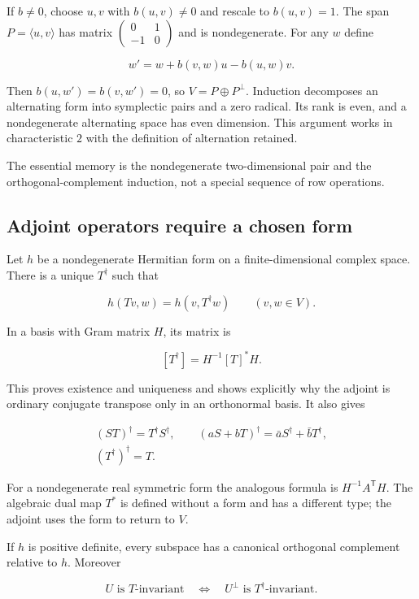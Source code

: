 \documentclass[
  11pt,
]{article}
\begin{document}
If \(b\ne0\), choose \(u,v\) with \(b(u,v)\ne0\) and rescale to
\(b(u,v)=1\). The span \(P=\langle u,v\rangle\) has matrix
\(\begin{pmatrix}0&1\\-1&0\end{pmatrix}\) and is nondegenerate. For any
\(w\) define

\[w'=w+b(v,w)u-b(u,w)v.\]

Then \(b(u,w')=b(v,w')=0\), so \(V=P\oplus P^\perp\). Induction
decomposes an alternating form into symplectic pairs and a zero radical.
Its rank is even, and a nondegenerate alternating space has even
dimension. This argument works in characteristic \(2\) with the
definition of alternation retained.

The essential memory is the nondegenerate two-dimensional pair and the
orthogonal-complement induction, not a special sequence of row
operations.

\subsection{Adjoint operators require a chosen
form}\label{adjoint-operators-require-a-chosen-form}

Let \(h\) be a nondegenerate Hermitian form on a finite-dimensional
complex space. There is a unique \(T^\dagger\) such that

\[h(Tv,w)=h(v,T^\dagger w)\qquad(v,w\in V).\]

In a basis with Gram matrix \(H\), its matrix is

\[[T^\dagger]=H^{-1}[T]^*H.\]

This proves existence and uniqueness and shows explicitly why the
adjoint is ordinary conjugate transpose only in an orthonormal basis. It
also gives

\[\begin{gathered}
(ST)^\dagger=T^\dagger S^\dagger,\qquad
(aS+bT)^\dagger=\bar aS^\dagger+\bar bT^\dagger,\\
(T^\dagger)^\dagger=T.
\end{gathered}\]

For a nondegenerate real symmetric form the analogous formula is
\(H^{-1}A^{\mathsf T}H\). The algebraic dual map \(T^*\) is defined
without a form and has a different type; the adjoint uses the form to
return to \(V\).

If \(h\) is positive definite, every subspace has a canonical orthogonal
complement relative to \(h\). Moreover

\[U\text{ is }T\text{-invariant}
\quad\Longleftrightarrow\quad
U^\perp\text{ is }T^\dagger\text{-invariant}.\]
\end{document}
